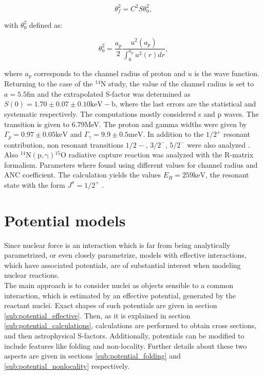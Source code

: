 \documentclass[openany]{book}
\begin{document}
\begin{equation}\label{eq:rmatrix_spectroscopic_reduced}
	\theta^2_f = C^2S \theta^2_0,
\end{equation}

with $\theta^2_0$ defined as:

\begin{equation}\label{eq:rmatrix_spectroscopic_reduced_theta0}
	\theta^2_0 = \frac{a_p}{2} \frac{u^2(a_p)}{\int_{0}^{a_p} {u^2(r) dr} },
\end{equation}

where $a_p$ corresponds to the channel radius of proton and $u$ is the wave function. \\

Returning to the case of the $\mathrm{{}^{14}N}$ study, 
the value of the channel radius is set to $a = 5.5\mathrm{fm}$ and the extrapolated S-factor was determined as $S(0) = 1.70 \pm 0.07 \pm 0.10 \mathrm{keV-b}$, where the last errors are the statistical and systematic respectively. The computations mostly considered s and p waves. The transition is given to 	6.79MeV. The proton and gamma widths were given by $\Gamma_p =  0.97 \pm 0.05 \mathrm{keV}$ and $\Gamma_\gamma = 9.9 \pm 0.5 \mathrm{meV}$. In addition to the $1/2^{+}$ resonant contribution, non resonant transitions $1/2^{}-$, $3/2^{-}$, $5/2^{-}$ were also analyzed \cite{angulo_champagne_trautvetter_2005}. Also $\mathrm{{}^{14}N(p, \gamma){}^{15}O}$ radiative capture reaction was analyzed with the R-matrix formalism.  Parameters where found using different values for channel radius and ANC coefficient. The calculation yields the values $E_{R} = 259 \mathrm{keV}$, the resonant state with the form $J^{\pi} = 1/2^{+}$ \cite{formicola_imbriani_costantini_angulo_bemmerer_bonetti_broggini_corvisiero_cruz_descouvemont_et_2004}. \\

\section{Potential models} \label{sec:potentialModels}


Since nuclear force is an interaction which is far from being analytically parametrized, or even closely parametrize, models with effective interactions, which have associated potentials, are of substantial interest when modeling nuclear reactions.  \\

The main approach is to consider nuclei as objects sensible to a common interaction, which is estimated by an effective potential, generated by the reactant nuclei. Exact shapes of such potentials are given in section \ref{sub:potential_effective}. Then, as it is explained in section \ref{sub:potential_calculations}, calculations are performed to obtain cross sections, and then astrophysical S-factors. Additionally, potentials can be modified to include features like folding and non-locality. Further details about these two aspects are given in sections \ref{sub:potential_folding} and \ref{sub:potential_nonlocality} respectively.
\end{document}
